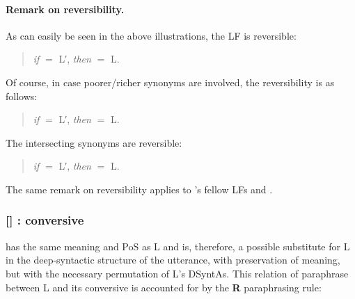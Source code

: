 \paragraph*{Remark on reversibility.}

As can easily be seen in the above illustrations, the LF  is reversible:

\begin{quote}
\emph{if}  $=$ L′, \emph{then}  $=$ L.
\end{quote}

Of course,  in case poorer\verythinspace/\verythinspace{}richer synonyms are involved, the reversibility is as follows:

\begin{quote}
\emph{if}  $=$ L′, \emph{then}  $=$ L.
\end{quote}

The intersecting synonyms are reversible:

\begin{quote}
\emph{if}  $=$ L′, \emph{then}  $=$ L.
\end{quote}

The same remark on reversibility applies to 's fellow LFs  and .

\subsubsection*{{\small []}  : conversive}\label{lf:Conv-ijk}


 has the same meaning and PoS as L and is, therefore, a possible substitute for L in the deep-syntactic structure of the utterance, with preservation of meaning, but with the necessary permutation of L's DSyntAs. This relation of paraphrase between L and its conversive is accounted for by the \textbf{R} paraphrasing rule:

